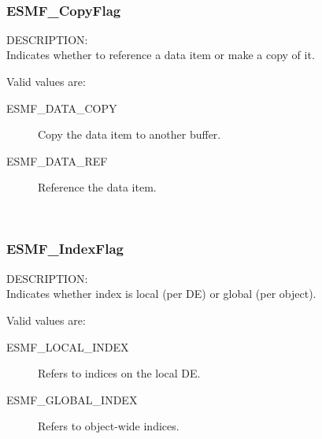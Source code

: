 \mbox{}\hrulefill\


\subsubsection{ESMF\_CopyFlag}

{\sf DESCRIPTION:\\}
Indicates whether to reference a data item or make a copy of it.

Valid values are:
\begin{description}
\item [ESMF\_DATA\_COPY]
      Copy the data item to another buffer.
\item [ESMF\_DATA\_REF]
      Reference the data item.
\end{description}

\mbox{}\hrulefill\

\subsubsection{ESMF\_IndexFlag}

{\sf DESCRIPTION:\\}
Indicates whether index is local (per DE) or global (per object).

Valid values are:
\begin{description}
\item [ESMF\_LOCAL\_INDEX]
      Refers to indices on the local DE.
\item [ESMF\_GLOBAL\_INDEX]
      Refers to object-wide indices.
\end{description}

\mbox{}\hrulefill\












